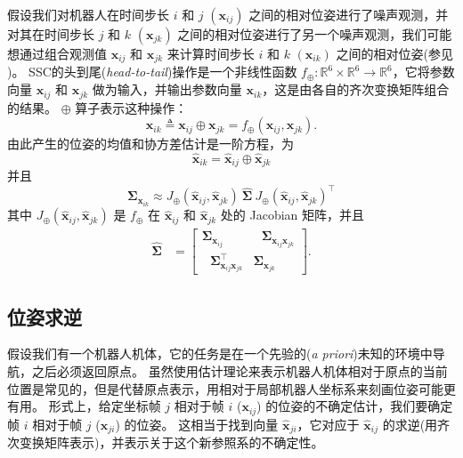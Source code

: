 假设我们对机器人在时间步长 $i$ 和 $j$ $(\mathbf{x}_{ij})$ 之间的相对位姿进行了噪声观测，并对其在时间步长 $j$ 和 $k$ $(\mathbf{x}_{jk})$ 之间的相对位姿进行了另一个噪声观测，我们可能想通过组合观测值 $\mathbf{x}_{ij}$ 和 $\mathbf{x}_{jk}$ 来计算时间步长 $i$ 和 $k$ $(\mathbf{x}_{ik})$ 之间的相对位姿(参见 )。 
SSC的头到尾(\textit{head-to-tail})操作是一个非线性函数 $f_\oplus: \mathbb{R}^{6} \times \mathbb{R}^6 \rightarrow \mathbb{R}^6$，它将参数向量 $\mathbf{x}_{ij}$ 和 $\mathbf{x}_{jk}$ 做为输入，并输出参数向量 $\mathbf{x}_{ik}$，这是由各自的齐次变换矩阵组合的结果。 
$\oplus$ 算子表示这种操作： 
\begin{equation}
    \mathbf{x}_{ik} \triangleq \mathbf{x}_{ij} \oplus \mathbf{x}_{jk} = f_\oplus(\mathbf{x}_{ij}, \mathbf{x}_{jk}).
\end{equation}
由此产生的位姿的均值和协方差估计是一阶方程，为 
\begin{equation}
    \hat{\mathbf{x}}_{ik} = \hat{\mathbf{x}}_{ij} \oplus \hat{\mathbf{x}}_{jk}
\end{equation}
并且 
\begin{equation}
    \boldsymbol{\Sigma}_{\mathbf{x}_{ik}} \approx J_\oplus(\hat{\mathbf{x}}_{ij}, \hat{\mathbf{x}}_{jk}) ~ \hat{\boldsymbol{\Sigma}} ~
    J_\oplus(\hat{\mathbf{x}}_{ij}, \hat{\mathbf{x}}_{jk})^\top
\end{equation}
其中 $J_\oplus(\hat{\mathbf{x}}_{ij}, \hat{\mathbf{x}}_{jk})$ 是 $f_\oplus$ 在 $\hat{\mathbf{x}}_{ij}$ 和 $\hat{\mathbf{x}}_{jk}$ 处的 Jacobian 矩阵，并且 
\begin{align}
    \hat{\boldsymbol{\Sigma}} 
    &= 
    \left[ \begin{array}{cc}
        \boldsymbol{\Sigma}_{
        \mathbf{x}_{ij}} & ~~~\boldsymbol{\Sigma}_{\mathbf{x}_{ij}\mathbf{x}_{jk}}  \\
        ~~~\boldsymbol{\Sigma}_{\mathbf{x}_{ij}\mathbf{x}_{jk}}^\top & \boldsymbol{\Sigma}_{\mathbf{x}_{jk}}
    \end{array} \right]. 
\end{align} 

\subsection{位姿求逆}
\label{sec:SSC:inverse}

假设我们有一个机器人机体，它的任务是在一个先验的(\textit{a priori})未知的环境中导航，之后必须返回原点。 
虽然使用估计理论来表示机器人机体相对于原点的当前位置是常见的，但是代替原点表示，用相对于局部机器人坐标系来刻画位姿可能更有用。 
形式上，给定坐标帧 $j$ 相对于帧 $i$ ($\mathbf{x}_{ij}$) 的位姿的不确定估计，我们要确定帧 $i$ 相对于帧 $j$ ($\mathbf{x}_{ji}$) 的位姿。 
这相当于找到向量 $\hat{\mathbf{x}}_{ji}$，它对应于 $\hat{\mathbf{x}}_{ij}$ 的求逆(用齐次变换矩阵表示)，并表示关于这个新参照系的不确定性。 

